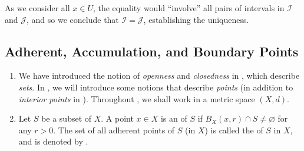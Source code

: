 \begin{enumerate}
\begin{pf}
As we consider all \(x\in U\), the equality would ``involve'' all pairs of
intervals in \(\mathcal{I}\) and \(\mathcal{J}\), and so we conclude that
\(\mathcal{I}=\mathcal{J}\), establishing the uniqueness.
\end{pf}
\end{enumerate}
\subsection{Adherent, Accumulation, and Boundary Points}
\label{subsect:adher-accum-bound-pts}
\begin{enumerate}
\item We have introduced the notion of \emph{openness} and \emph{closedness} in
, which describe \emph{sets}. In
, we will introduce some notions that
describe \emph{points} (in addition to \emph{interior points} in
). Throughout
, we shall work in a metric space
\((X,d)\).

\item Let \(S\) be a subset of \(X\). A point \(x\in X\) is an  of \(S\) if \(B_X(x,r)\cap S\ne\varnothing\) for any \(r>0\). The set of
all adherent points of \(S\) (in \(X\)) is called the  of \(S\)
in \(X\), and is denoted by .
\begin{center}
\end{center}


\end{enumerate}
